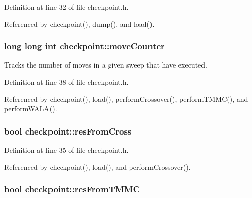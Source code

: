 Definition at line 32 of file checkpoint.\-h.



Referenced by checkpoint(), dump(), and load().

\hypertarget{classcheckpoint_a5ab49a355714da4874aba00eb03f701d}{
\subsubsection[{move\-Counter}]{\setlength{\rightskip}{0pt plus 5cm}long long int checkpoint\-::move\-Counter}}\label{classcheckpoint_a5ab49a355714da4874aba00eb03f701d}


Tracks the number of moves in a given sweep that have executed. 



Definition at line 38 of file checkpoint.\-h.



Referenced by checkpoint(), load(), perform\-Crossover(), perform\-T\-M\-M\-C(), and perform\-W\-A\-L\-A().

\hypertarget{classcheckpoint_ac3e65d26f2b8231ae9dd7e29c72ecf3b}{
\subsubsection[{res\-From\-Cross}]{\setlength{\rightskip}{0pt plus 5cm}bool checkpoint\-::res\-From\-Cross}}\label{classcheckpoint_ac3e65d26f2b8231ae9dd7e29c72ecf3b}


Definition at line 35 of file checkpoint.\-h.



Referenced by checkpoint(), load(), and perform\-Crossover().

\hypertarget{classcheckpoint_ab8f6081561b8c7871eea6743d4988d8a}{
\subsubsection[{res\-From\-T\-M\-M\-C}]{\setlength{\rightskip}{0pt plus 5cm}bool checkpoint\-::res\-From\-T\-M\-M\-C}}\label{classcheckpoint_ab8f6081561b8c7871eea6743d4988d8a}



